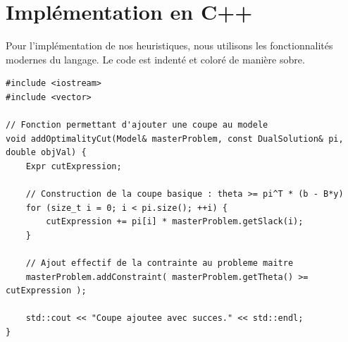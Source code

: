 \documentclass[12pt, a4paper, twoside]{report}
\begin{document}
\section{Implémentation en C++}

Pour l'implémentation de nos heuristiques, nous utilisons les fonctionnalités modernes du langage. Le code est indenté et coloré de manière sobre.

\begin{lstlisting}[caption={Ajout d'une coupe d'optimalité au solveur}, label={lst:cut_benders}]
#include <iostream>
#include <vector>

// Fonction permettant d'ajouter une coupe au modele
void addOptimalityCut(Model& masterProblem, const DualSolution& pi, double objVal) {
    Expr cutExpression;
    
    // Construction de la coupe basique : theta >= pi^T * (b - B*y)
    for (size_t i = 0; i < pi.size(); ++i) {
        cutExpression += pi[i] * masterProblem.getSlack(i);
    }
    
    // Ajout effectif de la contrainte au probleme maitre
    masterProblem.addConstraint( masterProblem.getTheta() >= cutExpression );
    
    std::cout << "Coupe ajoutee avec succes." << std::endl;
}
\end{lstlisting}

\clearpage
\thispagestyle{empty}
\null
\addtocounter{page}{-1}
\end{document}
